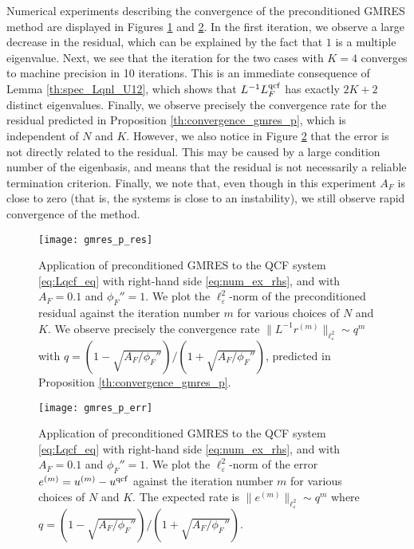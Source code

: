 \documentclass[12pt,reqno]{amsart}
\begin{document}
Numerical experiments describing the convergence of the preconditioned
GMRES method are displayed in Figures \ref{fig:gmres_p_res} and
\ref{fig:gmres_p_err}. In the first iteration, we observe a large
decrease in the residual, which can be explained by the fact that $1$
is a multiple eigenvalue. Next, we see that the iteration for the two
cases with $K = 4$ converges to machine precision in 10
iterations. This is an immediate consequence of Lemma
\ref{th:spec_Lqnl_U12}, which shows that ${{L}}^{-1} {L^{{\rm qcf}}_F}$ has exactly
$2K+2$ distinct eigenvalues. Finally, we observe precisely the
convergence rate for the residual predicted in Proposition
\ref{th:convergence_gmres_p}, which is independent of $N$ and
$K$. However, we also notice in Figure \ref{fig:gmres_p_err} that the
error is not directly related to the residual. This may be caused by a
large condition number of the eigenbasis, and means that the residual
is not necessarily a reliable termination criterion. Finally, we note
that, even though in this experiment $A_F$ is close to zero (that is,
the systems is close to an instability), we still observe rapid
convergence of the method.

\begin{figure}
  \begin{center}
    \texttt{[image: gmres\_p\_res]}
  \end{center}
  \caption{\label{fig:gmres_p_res} Application of preconditioned GMRES
    to the QCF system \eqref{eq:Lqcf_eq} with right-hand side
    \eqref{eq:num_ex_rhs}, and with $A_F = 0.1$ and $\phi_F'' = 1$. We
    plot the $\ell^2_{\varepsilon}$-norm of the preconditioned residual against
    the iteration number $m$ for various choices of $N$ and $K$. We
    observe precisely the convergence rate $\|L^{-1}
    r^{(m)}\|_{\ell^2_{\varepsilon}} \sim q^m$ with $q = (1 -
    \sqrt{A_F/\phi_F''}) / (1+\sqrt{A_F/\phi_F''})$, predicted in
    Proposition \ref{th:convergence_gmres_p}. }
\end{figure}

\begin{figure}
  \begin{center}
    \texttt{[image: gmres\_p\_err]}
  \end{center}
  \caption{\label{fig:gmres_p_err} Application of preconditioned GMRES
    to the QCF system \eqref{eq:Lqcf_eq} with right-hand side
    \eqref{eq:num_ex_rhs}, and with $A_F = 0.1$ and $\phi_F'' = 1$. We
    plot the $\ell^2_{\varepsilon}$-norm of the error $e^{(m)} = u^{(m)} -
    u^{\rm qcf}$ against the iteration number $m$ for various choices
    of $N$ and $K$. The expected rate is $\|e^{(m)}\|_{\ell^2_{\varepsilon}}
    \sim q^m$ where $q = (1 - \sqrt{A_F/\phi_F''}) /
    (1+\sqrt{A_F/\phi_F''})$. }
\end{figure}
\end{document}
